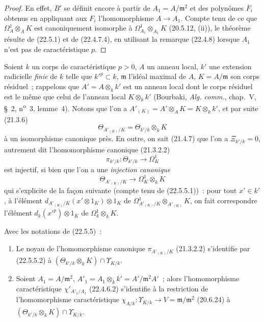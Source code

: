 \begin{proof}
En effet, $B'$ se définit encore à partir de $A_1=A/\mathfrak m^2$ et des
polynômes $\overline F_i$ obtenus en appliquant aux $F_i$ l'homomorphisme
$A\longrightarrow A_1$. Compte tenu de ce que $\Omega^1_A\otimes_AK$ est
canoniquement isomorphe à $\Omega^1_{A_1}\otimes_{A_1}K$ (20.5.12, (ii)), le
théorème résulte de (22.5.1) et de (22.4.7.4), en utilisant la remarque
(22.4.8) lorsque $A_1$ n'est pas de caractéristique $p$.
\end{proof}


\begin{env}[22.5.5]
\label{0.22.5.5-fr}
Soient $k$ un corps de caractéristique $p>0$, $A$ un anneau local, $k'$ une
extension radicielle \emph{finie} de $k$ telle que $k'^p\subset k$,
$\mathfrak m$ l'idéal maximal de $A$, $K=A/\mathfrak m$ son corps résiduel~;
rappelons que $A'=A\otimes_kk'$ est un anneau local dont le corps résiduel est
le même que celui de l'anneau local $K\otimes_kk'$ (Bourbaki,
\emph{Alg. comm.}, chap.~V, §~2, n\textsuperscript{o}~3, lemme~4). Notons que
l'on a $A'_{(K)}=A'\otimes_AK=K\otimes_kk'$, et par suite (21.3.6)
\begin{equation}
\label{0.22.5.5.1-fr}
  \Theta_{A'_{(K)}/K}=\Theta_{k'/k}\otimes_kK
  \tag{22.5.5.1}
\end{equation}
à un isomorphisme canonique près. En outre, on sait (21.4.7) que l'on a
$\Xi_{k'/k}=0$, autrement dit l'homomorphisme canonique (21.3.2.2)
\[
  \pi_{k'/k}:\Theta_{k'/k}\longrightarrow\Omega^1_K
\]
est injectif, si bien que l'on a une \emph{injection canonique}
\begin{equation}
\label{0.22.5.5.2-fr}
  \Theta_{A'_{(K)}/K}\longrightarrow\Omega^1_K\otimes_kK
  \tag{22.5.5.2}
\end{equation}
qui s'explicite de la façon suivante (compte tenu de (22.5.5.1))~: pour tout
$x'\in k'$, à l'élément
$d_{A'_{(K)}/K}(x'\otimes1_K)\otimes1_K$ de
$\Omega^1_{A'_{(K)}/K}\otimes_{A'_{(K)}}K$, on fait correspondre l'élément
$d_k(x'^p)\otimes1_K$ de $\Omega^1_k\otimes_kK$.
\end{env}

\begin{lemma}[22.5.6]
\label{0.22.5.6-fr}
Avec les notations de \textup{(22.5.5)}~:
\begin{enumerate}
  \item[\rm(i)] Le noyau de l'homomorphisme canonique
  $\pi_{A'_{(K)}/K}$ \textup{(21.3.2.2)} s'identifie par \textup{(22.5.5.2)} à
  $(\Theta_{k'/k}\otimes_kK)\cap\Upsilon_{K/k}$.
  \item[\rm(ii)] Soient $A_1=A/\mathfrak m^2$,
  $A'_1=A_1\otimes_kk'=A'/\mathfrak m^2A'$~; alors l'homomorphisme
  caractéristique $\chi'_{A'_1/A_1}$ \textup{(22.4.6.2)} s'identifie à la restriction de
  l'homomorphisme caractéristique
  $\chi_{A/k}:\Upsilon_{K/k}\longrightarrow V=\mathfrak m/\mathfrak m^2$
  \textup{(20.6.24)} à $(\Theta_{k'/k}\otimes_kK)\cap\Upsilon_{K/k}$.
\end{enumerate}
\end{lemma}

